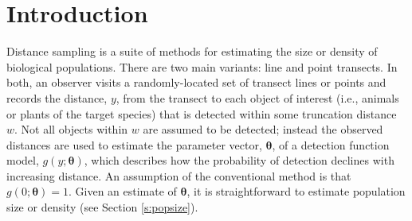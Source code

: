 \documentclass[useAMS,referee,usenatbib]{biom}
\begin{document}
%

\section{Introduction}
\label{s:intro}

Distance sampling \citep{Buckland:2001vm,Buckland:2004ts} is a suite of methods for estimating the size or density of biological populations.  There are two main variants: line and point transects. In both, an observer visits a randomly-located set of transect lines or points and records the distance, $y$, from the transect to each object of interest (i.e., animals or plants of the target species) that is detected within some truncation distance $w$.  Not all objects within $w$ are assumed to be detected; instead the observed distances are used to estimate the parameter vector, $\bm{\theta}$, of a detection function model, $g(y;\bm{\theta})$, which describes how the probability of detection declines with increasing distance.  An assumption of the conventional method is that $g(0;\bm{\theta})=1$. Given an estimate of $\bm{\theta}$, it is straightforward to estimate population size or density (see Section \ref{s:popsize}).
\end{document}
